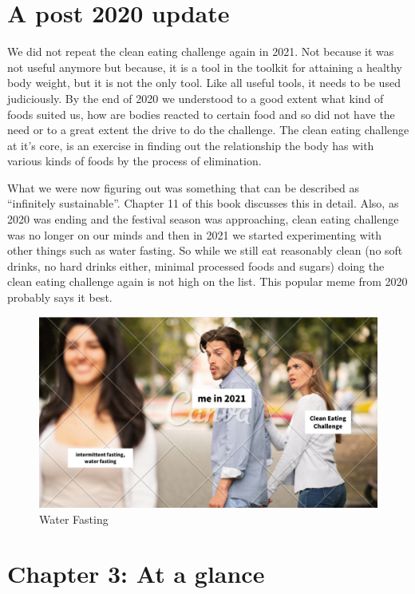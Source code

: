 \documentclass[
  oneside]{book}
\begin{document}
\hypertarget{a-post-2020-update}{%
\section{A post 2020 update}\label{a-post-2020-update}}

We did not repeat the clean eating challenge again in 2021. Not because it was not useful anymore but because, it is a tool in the toolkit for attaining a healthy body weight, but it is not the only tool. Like all useful tools, it needs to be used judiciously. By the end of 2020 we understood to a good extent what kind of foods suited us, how are bodies reacted to certain food and so did not have the need or to a great extent the drive to do the challenge. The clean eating challenge at it's core, is an exercise in finding out the relationship the body has with various kinds of foods by the process of elimination.

What we were now figuring out was something that can be described as ``infinitely sustainable''. Chapter 11 of this book discusses this in detail. Also, as 2020 was ending and the festival season was approaching, clean eating challenge was no longer on our minds and then in 2021 we started experimenting with other things such as water fasting. So while we still eat reasonably clean (no soft drinks, no hard drinks either, minimal processed foods and sugars) doing the clean eating challenge again is not high on the list. This popular meme from 2020 probably says it best.

\begin{figure}
\centering
\includegraphics{pictures/water-fasting-Meme.png}
\caption{Water Fasting}
\end{figure}

\hypertarget{chapter-3-at-a-glance}{%
\section{Chapter 3: At a glance}\label{chapter-3-at-a-glance}}
\end{document}
